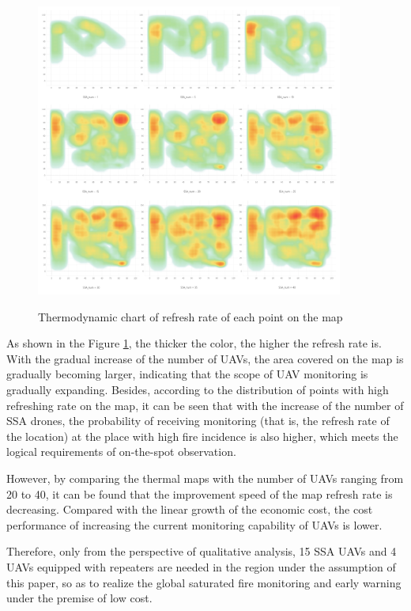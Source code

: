 \documentclass[13pt]{ctexart}
\begin{document}
\begin{figure}[h]
	\centering
	\includegraphics[width=0.9\textwidth]{fig/fig1.pdf}\\
	\vspace{-3mm}
	\caption{Thermodynamic chart of refresh rate of each point on the map}
	\label{fig:fig1}
	\vspace{-4ex}
\end{figure}

As shown in the Figure \ref{fig:fig1}, the thicker the color, the higher the refresh rate is. With the gradual increase of the number of UAVs, the area covered on the map is gradually becoming larger, indicating that the scope of UAV monitoring is gradually expanding. Besides, according to the distribution of points with high refreshing rate on the map, it can be seen that with the increase of the number of SSA drones, the probability of receiving monitoring (that is, the refresh rate of the location) at the place with high fire incidence is also higher, which meets the logical requirements of on-the-spot observation.

However, by comparing the thermal maps with the number of UAVs ranging from 20 to 40, it can be found that the improvement speed of the map refresh rate is decreasing. Compared with the linear growth of the economic cost, the cost performance of increasing the current monitoring capability of UAVs is lower.

Therefore, only from the perspective of qualitative analysis, 15 SSA UAVs and 4 UAVs equipped with repeaters are needed in the region under the assumption of this paper, so as to realize the global saturated fire monitoring and early warning under the premise of low cost.
\end{document}
